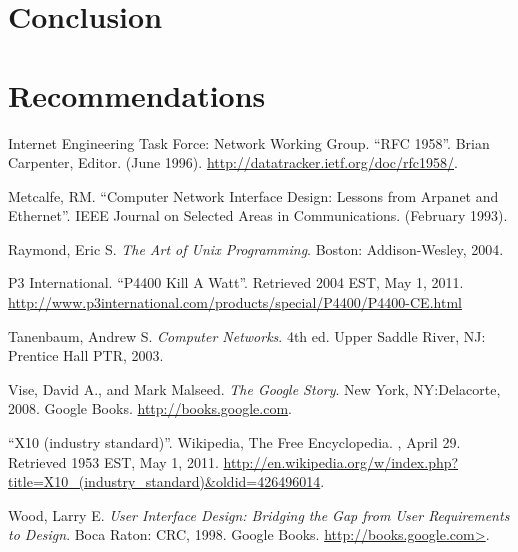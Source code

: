 \documentclass[12pt]{article}
\begin{document}
\section{Conclusion}


\section{Recommendations}


\renewcommand{\refname}{\section{References}}
\begin{thebibliography}{10}

 Internet Engineering Task Force: Network Working Group.
  \newblock ``RFC 1958''.
  \newblock Brian Carpenter, Editor.
  \newblock (June 1996).
  \newblock \url{http://datatracker.ietf.org/doc/rfc1958/}.

 Metcalfe, RM.
  \newblock ``Computer Network Interface Design: Lessons from
  Arpanet and Ethernet''.
  \newblock IEEE Journal on Selected Areas in Communications.
  \newblock (February 1993).

 Raymond, Eric S.
  \newblock \emph{The Art of Unix Programming}.
  \newblock Boston: Addison-Wesley, 2004.

 P3 International.
  \newblock ``P4400 Kill A Watt''.
  \newblock Retrieved 2004 EST, May 1, 2011.
  \newblock \url{http://www.p3international.com/products/special/P4400/P4400-CE.html}

 Tanenbaum, Andrew S.
  \newblock \emph{Computer Networks}. 4th ed.
  \newblock Upper Saddle River, NJ: Prentice Hall PTR, 2003.

 Vise, David A., and Mark Malseed.
  \newblock \emph{The Google Story}.
  \newblock New York, NY:Delacorte, 2008.
  \newblock Google Books.
  \newblock \url{http://books.google.com}.

 ``X10 (industry standard)''.
  \newblock Wikipedia, The Free Encyclopedia.
  , April 29.  Retrieved 1953 EST, May 1, 2011.
  \newblock \url{http://en.wikipedia.org/w/index.php?title=X10_(industry_standard)&oldid=426496014}.

 Wood, Larry E.
  \newblock \emph{User Interface Design: Bridging the Gap from User
    Requirements to Design}.
  \newblock Boca Raton: CRC, 1998.
  \newblock Google Books.
  \newblock \url{http://books.google.com>}.

\end{thebibliography}
\end{document}
